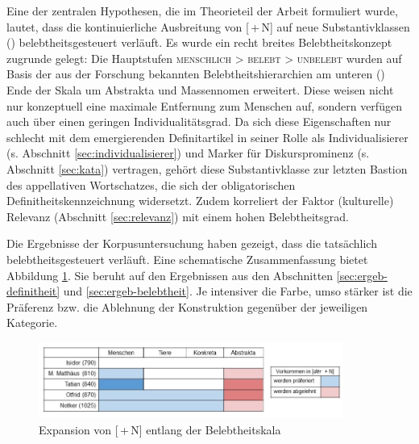 Eine der zentralen Hypothesen, die im Theorieteil der Arbeit formuliert wurde, lautet, dass die kontinuierliche Ausbreitung von [\,+\,N] auf neue Substantivklassen () belebtheitsgesteuert verläuft. Es wurde ein recht breites Belebtheitskonzept zugrunde gelegt: Die Hauptstufen \textsc{menschlich > belebt > unbelebt} wurden auf Basis der aus der Forschung bekannten Belebtheitshierarchien \parencite[u.a.][]{Comrie1989,Yamamoto1999,Croft2006,Enger2011} am unteren () Ende der Skala um Abstrakta und Massennomen erweitert. Diese weisen nicht nur konzeptuell eine maximale Entfernung zum Menschen auf, sondern verfügen auch über einen geringen Individualitätsgrad. Da sich diese Eigenschaften nur schlecht mit dem emergierenden Definitartikel in seiner Rolle als Individualisierer (s. Abschnitt \ref{sec:individualisierer}) und Marker für Diskursprominenz (s. Abschnitt \ref{sec:kata}) vertragen, gehört diese Substantivklasse zur letzten Bastion des appellativen Wortschatzes, die sich der obligatorischen Definitheitskennzeichnung widersetzt. Zudem korreliert der Faktor (kulturelle) Relevanz (Abschnitt \ref{sec:relevanz}) mit einem hohen Belebtheitsgrad. 

Die Ergebnisse der Korpusuntersuchung haben gezeigt, dass die  tatsächlich belebtheitsgesteuert verläuft. Eine schematische Zusammenfassung bietet Abbildung \ref{abb:expansion-belebtheit}. Sie beruht auf den Ergebnissen aus den Abschnitten \ref{sec:ergeb-definitheit} und \ref{sec:ergeb-belebtheit}. Je intensiver die Farbe, umso stärker ist die Präferenz bzw. die Ablehnung der Konstruktion gegenüber der jeweiligen Kategorie. 

\begin{figure}
\begin{center}
  \includegraphics[width=10cm]{images/belebtheitsexpansion-neu.jpg}
\caption {Expansion von [\,+\,N] entlang der Belebtheitskala} 
\label{abb:expansion-belebtheit}
\end{center}
\end{figure} 
  
